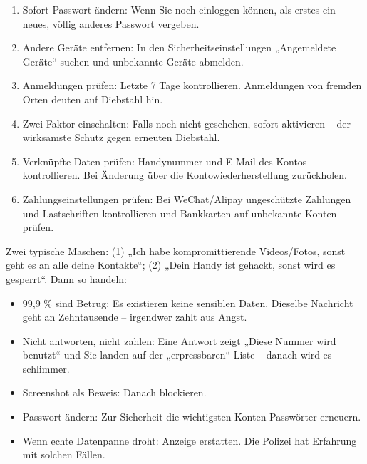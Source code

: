 
\begin{enumerate}
  \item Sofort Passwort ändern: Wenn Sie noch einloggen können, als erstes ein neues, völlig anderes Passwort vergeben.
  \item Andere Geräte entfernen: In den Sicherheitseinstellungen „Angemeldete Geräte“ suchen und unbekannte Geräte abmelden.
  \item Anmeldungen prüfen: Letzte 7 Tage kontrollieren. Anmeldungen von fremden Orten deuten auf Diebstahl hin.
  \item Zwei-Faktor einschalten: Falls noch nicht geschehen, sofort aktivieren – der wirksamste Schutz gegen erneuten Diebstahl.
  \item Verknüpfte Daten prüfen: Handynummer und E-Mail des Kontos kontrollieren. Bei Änderung über die Kontowiederherstellung zurückholen.
  \item Zahlungseinstellungen prüfen: Bei WeChat/Alipay ungeschützte Zahlungen und Lastschriften kontrollieren und Bankkarten auf unbekannte Konten prüfen.
\end{enumerate}


Zwei typische Maschen: (1) „Ich habe kompromittierende Videos/Fotos, sonst geht es an alle deine Kontakte“; (2) „Dein Handy ist gehackt, sonst wird es gesperrt“. Dann so handeln:

\begin{itemize}
  \item 99,9 \% sind Betrug: Es existieren keine sensiblen Daten. Dieselbe Nachricht geht an Zehntausende – irgendwer zahlt aus Angst.
  \item Nicht antworten, nicht zahlen: Eine Antwort zeigt „Diese Nummer wird benutzt“ und Sie landen auf der „erpressbaren“ Liste – danach wird es schlimmer.
  \item Screenshot als Beweis: Danach blockieren.
  \item Passwort ändern: Zur Sicherheit die wichtigsten Konten-Passwörter erneuern.
  \item Wenn echte Datenpanne droht: Anzeige erstatten. Die Polizei hat Erfahrung mit solchen Fällen.
\end{itemize}


